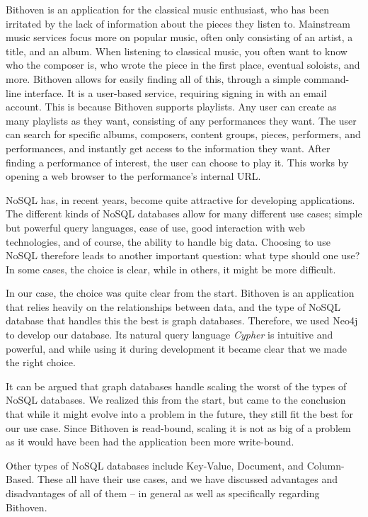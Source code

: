 Bithoven is an application for the classical music enthusiast, who has been
irritated by the lack of information about the pieces they listen to. Mainstream
music services focus more on popular music, often only consisting of an artist,
a title, and an album. When listening to classical music, you often want to know
who the composer is, who wrote the piece in the first place, eventual soloists,
and more. Bithoven allows for easily finding all of this, through a simple
command-line interface. It is a user-based service, requiring signing in with an
email account. This is because Bithoven supports playlists. Any user can create
as many playlists as they want, consisting of any performances they want. The
user can search for specific albums, composers, content groups, pieces,
performers, and performances, and instantly get access to the information they
want. After finding a performance of interest, the user can choose to play it.
This works by opening a web browser to the performance's internal URL.

NoSQL has, in recent years, become quite attractive for developing applications.
The different kinds of NoSQL databases allow for many different use cases;
simple but powerful query languages, ease of use, good interaction with web
technologies, and of course, the ability to handle big data. Choosing to use
NoSQL therefore leads to another important question: what type should one use?
In some cases, the choice is clear, while in others, it might be more difficult.

In our case, the choice was quite clear from the start. Bithoven is an
application that relies heavily on the relationships between data, and the type
of NoSQL database that handles this the best is graph databases. Therefore, we
used Neo4j to develop our database. Its natural query language \emph{Cypher}
is intuitive and powerful, and while using it during development it became clear
that we made the right choice.

It can be argued that graph databases handle scaling the worst of the types of
NoSQL databases. We realized this from the start, but came to the conclusion
that while it might evolve into a problem in the future, they still fit the best
for our use case. Since Bithoven is read-bound, scaling it is not as big of a
problem as it would have been had the application been more write-bound.

Other types of NoSQL databases include Key-Value, Document, and Column-Based.
These all have their use cases, and we have discussed advantages and
disadvantages of all of them -- in general as well as specifically regarding
Bithoven.
